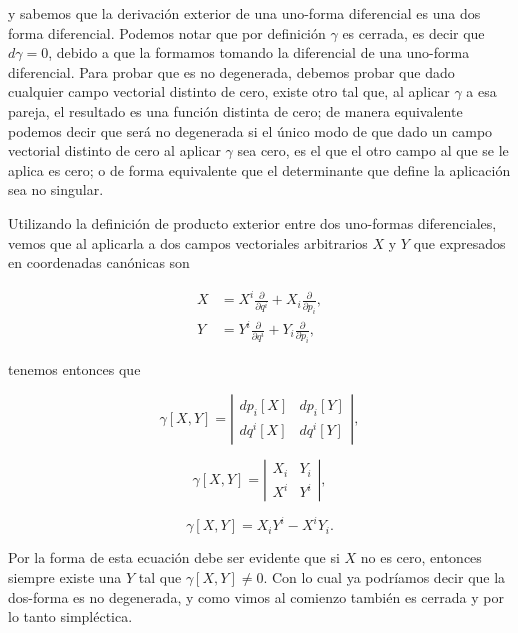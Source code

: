 \documentclass[a4paper,10pt]{article}
\numberwithin{equation}{section}
\begin{document}
y sabemos que la derivación exterior de una uno-forma diferencial es una dos forma 
diferencial. Podemos notar que por definición $\gamma$ es cerrada, es decir que 
$d\gamma = 0$, debido a que la formamos tomando la diferencial de una uno-forma 
diferencial. Para probar que es no degenerada, debemos probar que dado cualquier 
campo vectorial distinto de cero, existe otro tal que, al aplicar $\gamma$ a esa pareja, 
el resultado es una función distinta de cero; de manera equivalente podemos decir 
que será no degenerada si el único modo de que dado un campo vectorial distinto de 
cero al aplicar $\gamma$ sea cero, es el que el otro campo al que se le aplica 
es cero; o de forma equivalente que el determinante que define la aplicación 
sea no singular. 

\vspace{.3cm}

Utilizando la definición de producto exterior entre dos uno-formas diferenciales, vemos 
que al aplicarla a dos campos vectoriales arbitrarios $X$ y $Y$ que expresados 
en coordenadas canónicas son 

\begin{align}
 X &= X^i\frac{\partial}{\partial q^i} + X_i\frac{\partial}{\partial p_i}, \\
 Y &= Y^i\frac{\partial}{\partial q^i} + Y_i\frac{\partial}{\partial p_i},
\end{align}

tenemos entonces que

\begin{equation}
 \gamma[X,Y] = \left|\begin{matrix}
                dp_i[X] & dp_i[Y] \\
                dq^i[X] & dq^i[Y]
               \end{matrix}\right|,
\end{equation}

\begin{equation}
 \gamma[X,Y] = \left|\begin{matrix}
                X_i & Y_i \\
                X^i & Y^i
               \end{matrix}\right|,
\end{equation}

\begin{equation}
 \gamma[X,Y] = X_i Y^i - X^iY_i.
\end{equation}

Por la forma de esta ecuación debe ser evidente que si $X$ no es cero, entonces 
siempre existe una $Y$ tal que $\gamma[X,Y] \ne 0$. Con lo cual ya podríamos decir 
que la dos-forma es no degenerada, y como vimos al comienzo también es cerrada 
y por lo tanto simpléctica. 
\end{document}
